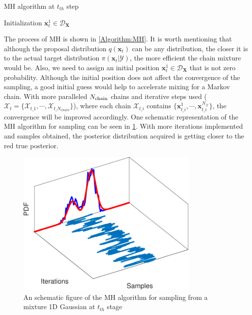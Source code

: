 \begin{algorithm}
    \caption{\acrlong{MH} algorithm at $t_{th}$ step}
    \label{Algorithm:MH}
    Initialization $\boldsymbol{x}_{t}^{1} \in \mathcal{D}_{\bm{X}}$\; 
\end{algorithm}
The process of \acrshort{MH} is shown in \ref{Algorithm:MH}. It is worth mentioning that although the proposal distribution $q(\boldsymbol{x}_{t})$ can be any distribution, the closer it is to the actual target distribution $\pi(\boldsymbol{x}_{t}|\mathcal{Y})$, the more efficient the chain mixture would be. Also, we need to assign an initial position $\boldsymbol{x}_{t}^{1} \in \mathcal{D}_{\bm{X}}$ that is not zero probability. Although the initial position does not affect the convergence of the sampling, a good initial guess would help to accelerate mixing for a Markov chain. With more paralleled $N_{\rm{chain}}$ chains and iterative steps used ($\mathcal{X}_{t} = \{ \mathcal{X}_{t\_1},\cdots,\mathcal{X}_{t\_N_{chain}}\}$), where each chain $\mathcal{X}_{t\_i}$ contains $\{ \boldsymbol{x}_{t\_i}^{1},\cdots,\boldsymbol{x}_{t\_i}^{N_{\mathcal{X}}}\}$, the convergence will be improved accordingly. One schematic representation of the \acrshort{MH} algorithm for sampling can be seen in \cref{fig: MH_example}. With more iterations implemented and samples obtained, the posterior distribution acquired is getting closer to the red true posterior.
\begin{figure}[htbp]
    \centering
    \includegraphics[width = 90mm]{Figures/figure-MCMC_sampling.pdf}
\caption{An schematic figure of the \acrshort{MH} algorithm for sampling from a mixture 1D Gaussian at $t_{th}$ stage}
\label{fig: MH_example}
\end{figure}

